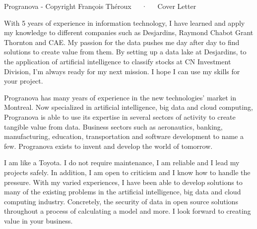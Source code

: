 \documentclass[11pt, a4paper]{awesome-cv}
\begin{document}
\makecvheader[R]

\makecvfooter
  {Progranova - Copyright }
  {François Théroux~~~·~~~Cover Letter}
  {}

\makelettertitle

\begin{cvletter}

With 5 years of experience in information technology, I have learned and apply my knowledge to different companies such as Desjardins, Raymond Chabot Grant Thornton and CAE. My passion for the data pushes me day after day to find solutions to create value from them. By setting up a data lake at Desjardins, to the application of artificial intelligence to classify stocks at CN Investment Division, I'm always ready for my next mission. I hope I can use my skills for your project.

Progranova has many years of experience in the new technologies' market in Montreal. Now specialized in artificial intelligence, big data and cloud computing, Progranova is able to use its expertise in several sectors of activity to create tangible value from data. Business sectors such as aeronautics, banking, manufacturing, education, transportation and software development to name a few. Progranova exists to invent and develop the world of tomorrow.

I am like a Toyota. I do not require maintenance, I am reliable and I lead my projects safely. In addition, I am open to criticism and I know how to handle the pressure. With my varied experiences, I have been able to develop solutions to many of the existing problems in the artificial intelligence, big data and cloud computing industry. Concretely, the security of data in open source solutions throughout a process of calculating a model and more.
\newline
\newline
I look forward to creating value in your business.

\end{cvletter}

\makeletterclosing
\end{document}
